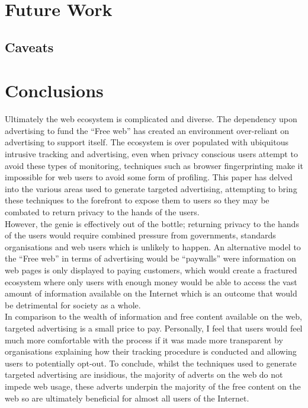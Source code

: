 \documentclass[12pt]{article}
\begin{document}
\section{Future Work}
\subsection{Caveats}

\section{Conclusions}
Ultimately the web ecosystem is complicated and diverse. The dependency upon advertising to fund the ``Free web'' has created an environment over-reliant on advertising to support itself. The ecosystem is over populated with ubiquitous intrusive tracking and advertising, even when privacy conscious users attempt to avoid these types of monitoring, techniques such as browser fingerprinting make it impossible for web users to avoid some form of profiling. This paper has delved into the various areas used to generate targeted advertising, attempting to bring these techniques to the forefront to expose them to users so they may be combated to return privacy to the hands of the users. \\

However, the genie is effectively out of the bottle; returning privacy to the hands of the users would require combined pressure from governments, standards organisations and web users which is unlikely to happen. An alternative model to the ``Free web'' in terms of advertising would be ``paywalls'' were information on web pages is only displayed to paying customers, which would create a fractured ecosystem where only users with enough money would be able to access the vast amount of information available on the Internet which is an outcome that would be detrimental for society as a whole. \\

In comparison to the wealth of information and free content available on the web, targeted advertising is a small price to pay. Personally, I feel that users would feel much more comfortable with the process if it was made more transparent by organisations explaining how their tracking procedure is conducted and allowing users to potentially opt-out. To conclude, whilst the techniques used to generate targeted advertising are insidious, the majority of adverts on the web do not impede web usage, these adverts underpin the majority of the free content on the web so are ultimately beneficial for almost all users of the Internet.
\end{document}

